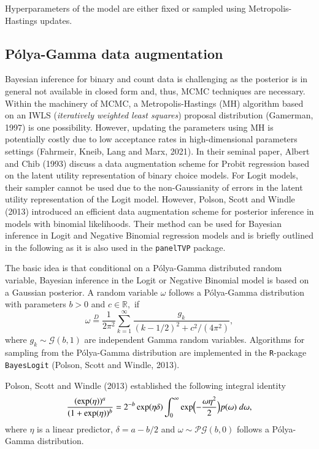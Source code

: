 \documentclass[a4paper, preprint, 3p,
authoryear]{elsarticle} %
\begin{document}
Hyperparameters of the model are either fixed or sampled using
Metropolis-Hastings updates.

\subsection{Pólya-Gamma data
augmentation}\label{puxf3lya-gamma-data-augmentation}

Bayesian inference for binary and count data is challenging as the
posterior is in general not available in closed form and, thus, MCMC
techniques are necessary. Within the machinery of MCMC, a
Metropolis-Hastings (MH) algorithm based on an IWLS
(\textit{iteratively weighted least squares}) proposal distribution
(Gamerman, 1997) is one possibility. However, updating the parameters
using MH is potentially costly due to low acceptance rates in
high-dimensional parameters settings (Fahrmeir, Kneib, Lang and Marx,
2021). In their seminal paper, Albert and Chib (1993) discuss a data
augmentation scheme for Probit regression based on the latent utility
representation of binary choice models. For Logit models, their sampler
cannot be used due to the non-Gaussianity of errors in the latent
utility representation of the Logit model. However, Polson, Scott and
Windle (2013) introduced an efficient data augmentation scheme for
posterior inference in models with binomial likelihoods. Their method
can be used for Bayesian inference in Logit and Negative Binomial
regression models and is briefly outlined in the following as it is also
used in the \texttt{panelTVP} package.

The basic idea is that conditional on a Pólya-Gamma distributed random
variable, Bayesian inference in the Logit or Negative Binomial model is
based on a Gaussian posterior. A random variable \(\omega\) follows a
Pólya-Gamma distribution with parameters \(b > 0\) and
\(c \in \mathbb{R},\) if \begin{equation*}
    \omega \overset{D}{=} \frac{1}{2\pi^2}\sum_{k=1}^\infty \frac{g_k}{(k-1/2)^2+c^2/(4\pi^2)},
\end{equation*} where \(g_k \sim \mathcal{G}(b,1)\) are independent
Gamma random variables. Algorithms for sampling from the Pólya-Gamma
distribution are implemented in the \texttt{R}-package
\texttt{BayesLogit} (Polson, Scott and Windle, 2013).

Polson, Scott and Windle (2013) established the following integral
identity \begin{equation}
\label{Integral}
    \frac{(\exp(\eta))^a}{(1+\exp(\eta))^b} = 2 ^{-b}\exp(\eta\delta)\int_0^\infty \exp\Bigl(-\frac{\omega\eta^2}{2}\Bigr) p(\omega) \; d\omega,
\end{equation} where \(\eta\) is a linear predictor, \(\delta = a-b/2\)
and \(\omega \sim \mathcal{PG}(b,0)\) follows a Pólya-Gamma
distribution.
\end{document}

